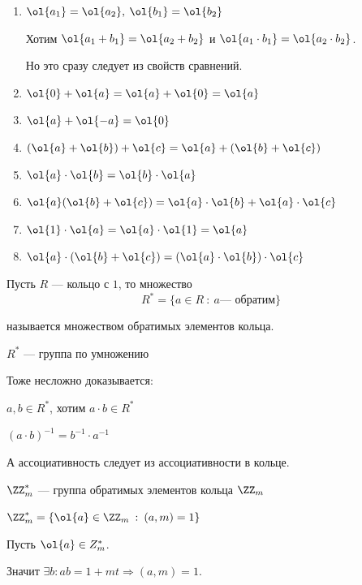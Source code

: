 \begin{enumerate}
    \item
        \( \ol{a_1} = \ol{a_2}, \: \ol{b_1} = \ol{b_2} \)

        Хотим \( \ol{a_1 + b_1} = \ol{a_2 + b_2} \) и \( \ol{a_1 \cdot b_1} = \ol{a_2 \cdot b_2} \).

        Но это сразу следует из свойств сравнений.
    \item
        \( \ol{0} + \ol{a} = \ol{a} + \ol{0} = \ol{a} \)
    \item
        \( \ol{a} + \ol{-a} = \ol{0} \)
    \item
        \( (\ol{a} + \ol{b}) + \ol{c} = \ol{a} + (\ol{b} + \ol{c}) \)
    \item
        \( \ol{a} \cdot \ol{b} = \ol{b} \cdot \ol{a} \)
    \item
        \( \ol{a} (\ol{b} + \ol{c}) = \ol{a} \cdot \ol{b} + \ol{a} \cdot \ol{c} \)
    \item
        \( \ol{1} \cdot \ol{a} = \ol{a} \cdot \ol{1} = \ol{a} \)
    \item
        \( \ol{a} \cdot (\ol{b} + \ol{c}) = (\ol{a} \cdot \ol{b}) \cdot \ol{c} \)
\end{enumerate}


\begin{defn}{}{}
    Пусть \( R \) --- кольцо с \( 1 \), то множество
    \[
        R^* = \{ a \in R \: : \: a \text{--- обратим} \}
    \]

    называется множеством обратимых элементов кольца.
\end{defn}

\begin{lemma}{}{}
    \( R^* \) --- группа по умножению
\end{lemma}

Тоже несложно доказывается:

\( a, b \in R^* \), хотим \( a \cdot b \in R^* \)

\( (a \cdot b)^{-1} = b^{-1} \cdot a^{-1} \)

А ассоциативность следует из ассоциативности в кольце.

\( \ZZ_m^* \) --- группа обратимых элементов кольца \( \ZZ_m \)

\begin{thrm}{}{}
    \( \ZZ_m^* = \{ \ol{a} \in \ZZ_m \: : \: (a, m) = 1 \} \)
\end{thrm}

Пусть \( \ol{a} \in Z_m^* \).

Значит \( \exists b : ab = 1 + mt \Rightarrow (a, m) = 1 \).

